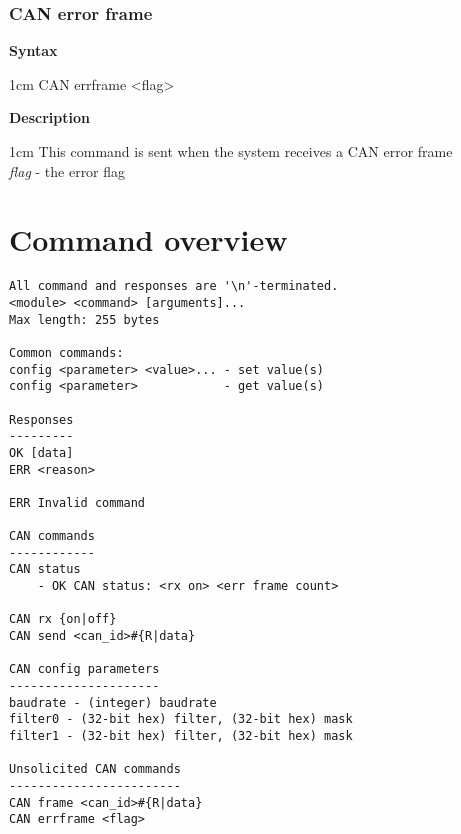 \documentclass{article}[a4paper]
\begin{document}
\subsubsection{CAN error frame}
\begin{tcolorbox}
	{\bf Syntax}

	 1cm \dimexpr\linewidth-2cm\relax
	CAN errframe <flag>

	\medskip
	{\bf Description}

	 1cm \dimexpr\linewidth-2cm\relax
	This command is sent when the system receives a CAN error frame
	\medskip \\
	{\it flag} - the error flag
\end{tcolorbox}



\begin{comment}

\section{LIN}
LIN commands
------------
LIN send <id>
LIN set txbuffer <n> <data>     - empty <data> disables TX buffer

Unsolicited commands:
LIN frame
error?

\end{comment}

\section{Command overview}
\begin{verbatim}
All command and responses are '\n'-terminated.
<module> <command> [arguments]...
Max length: 255 bytes

Common commands:
config <parameter> <value>... - set value(s)
config <parameter>            - get value(s)

Responses
---------
OK [data]
ERR <reason>

ERR Invalid command

CAN commands
------------
CAN status
    - OK CAN status: <rx on> <err frame count>

CAN rx {on|off}
CAN send <can_id>#{R|data}

CAN config parameters
---------------------
baudrate - (integer) baudrate
filter0 - (32-bit hex) filter, (32-bit hex) mask
filter1 - (32-bit hex) filter, (32-bit hex) mask

Unsolicited CAN commands
------------------------
CAN frame <can_id>#{R|data}
CAN errframe <flag>
\end{verbatim}
\end{document}

